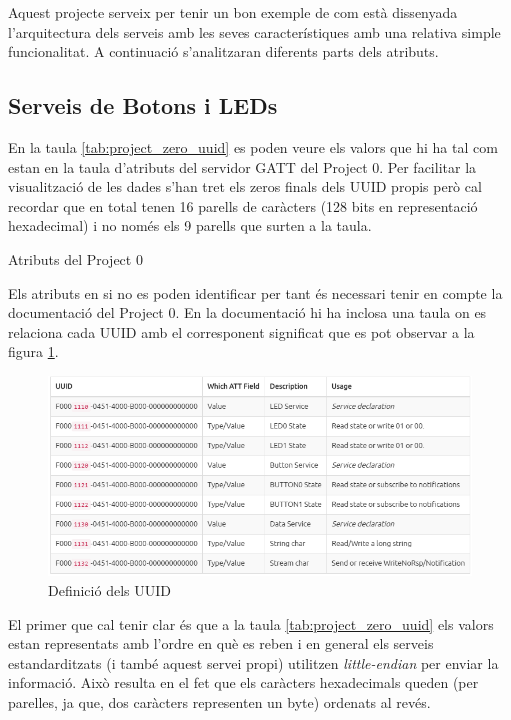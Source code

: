 Aquest projecte serveix per tenir un bon exemple de com està dissenyada l'arquitectura dels serveis amb les seves característiques amb una relativa simple funcionalitat. A continuació s'analitzaran diferents parts dels atributs.

\subsection{Serveis de Botons i LEDs}

En la taula \ref{tab:project_zero_uuid} es poden veure els valors que hi ha tal com estan en la taula d'atributs del servidor GATT del Project 0.
Per facilitar la visualització de les dades s'han tret els zeros finals dels UUID propis però cal recordar que en total tenen 16 parells de caràcters (128 bits en representació hexadecimal) i no només els 9 parells que surten a la taula.
\begin{table}[h!]
	\begin{center}
		\caption{Atributs del Project 0}
		\label{tab:project_zero_uuid}
	\end{center}
\end{table}
Els atributs en si no es poden identificar per tant és necessari tenir en compte la documentació del Project 0.
En la documentació hi ha inclosa una taula on es relaciona cada UUID amb el corresponent significat que es pot observar a la figura \ref{project0_table}.

\begin{figure}[h!]
	\begin{center}
		\includegraphics[width=\textwidth]{./images/Project_0_UUID.png}
		\caption{Definició dels UUID \cite{project0_UUIDs}}
		\label{project0_table}
	\end{center}
\end{figure}

El primer que cal tenir clar és que a la taula \ref{tab:project_zero_uuid} els valors estan representats amb l'ordre en què es reben i en general els serveis estandarditzats (i també aquest servei propi) utilitzen \textit{little-endian} per enviar la informació.
Això resulta en el fet que els caràcters hexadecimals queden (per parelles, ja que, dos caràcters representen un byte) ordenats al revés.

